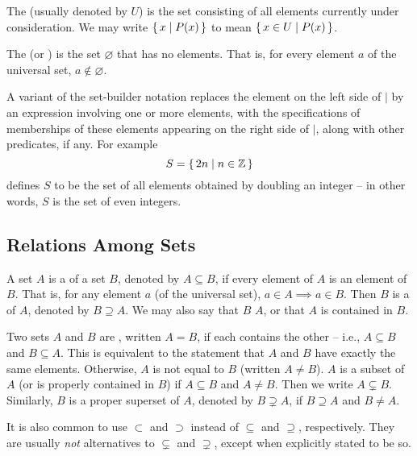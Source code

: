 The  (usually denoted by $U$) is the set consisting of all elements currently under consideration. We may write $\qty{\, x \mid P(x) \,}$ to mean $\qty{\, x \in U \mid P(x) \,}$.

The  (or ) is the set $\varnothing$ that has no elements. That is, for every element $a$ of the universal set, $a \notin \varnothing$.

\begin{Note*}
A variant of the set-builder notation replaces the element on the left side of $\mid$ by an expression involving one or more elements, with the specifications of memberships of these elements appearing on the right side of $\mid$, along with other predicates, if any. For example
\begin{equation*}
S = \qty{\, 2n \mid n \in \mathbb Z \,}
\end{equation*}
defines $S$ to be the set of all elements obtained by doubling an integer -- in other words, $S$ is the set of even integers.
\end{Note*}

\subsection{Relations Among Sets}\label{subsec:SetRels}

A set $A$ is a  of a set $B$, denoted by $A \subseteq B$, if every element of $A$ is an element of $B$. That is, for any element $a$ (of the universal set), $a \in A \implies a \in B$. Then $B$ is a  of $A$, denoted by $B \supseteq A$. We may also say that $B$  $A$, or that $A$ is contained in $B$.

Two sets $A$ and $B$ are , written $A = B$, if each contains the other -- i.e., $A \subseteq B$ and $B \subseteq A$. This is equivalent to the statement that $A$ and $B$ have exactly the same elements. Otherwise, $A$ is not equal to $B$ (written $A \ne B$). $A$ is a  subset of $A$ (or is properly contained in $B$) if $A \subseteq B$ and $A \ne B$. Then we write $A \subsetneq B$. Similarly, $B$ is a proper superset of $A$, denoted by $B \supsetneq A$, if $B \supseteq A$ and $B \ne A$.

\begin{Note*}
It is also common to use $\subset$ and $\supset$ instead of $\subseteq$ and $\supseteq$, respectively. They are usually \emph{not} alternatives to $\subsetneq$ and $\supsetneq$, except when explicitly stated to be so.
\end{Note*}

